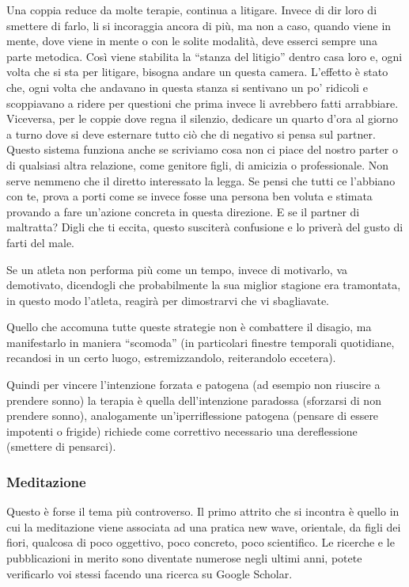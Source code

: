 \documentclass[12pt]{book} %
\begin{document}
Una coppia reduce da molte terapie, continua a litigare. Invece di dir loro di smettere di farlo, li si incoraggia
ancora di più, ma non a caso, quando viene in mente, dove viene in mente o con le solite modalità, deve esserci sempre
una parte metodica. Così viene stabilita la “stanza del litigio” dentro casa loro e, ogni volta che si sta per
litigare, bisogna andare un questa camera. L'effetto è stato che, ogni volta che andavano in questa stanza si sentivano
un po' ridicoli e scoppiavano a ridere per questioni che prima invece li avrebbero fatti arrabbiare. Viceversa, per le
coppie dove regna il silenzio, dedicare un quarto d'ora al giorno a turno dove si deve esternare
tutto ciò che di negativo si pensa sul partner. Questo sistema funziona anche se scriviamo cosa non ci piace del nostro
parter o di qualsiasi altra relazione, come genitore figli, di amicizia o professionale. Non serve nemmeno che il
diretto interessato la legga. Se pensi che tutti ce l'abbiano con te, prova a porti come se invece fosse una persona
ben voluta e stimata provando a fare un'azione concreta in questa direzione. E se il partner di maltratta? Digli che ti
eccita, questo susciterà confusione e lo priverà del gusto di farti del male.

Se un atleta non performa più come un tempo, invece di motivarlo, va demotivato, dicendogli che probabilmente la sua
miglior stagione era tramontata, in questo modo l'atleta, reagirà per dimostrarvi che vi sbagliavate. 

Quello che accomuna tutte queste strategie non è combattere il disagio, ma manifestarlo in maniera “scomoda” (in
particolari finestre temporali quotidiane, recandosi in un certo luogo, estremizzandolo, reiterandolo eccetera).

Quindi per vincere l'intenzione forzata e patogena (ad esempio non riuscire a prendere sonno) la
terapia è quella dell'intenzione paradossa (sforzarsi di non prendere sonno), analogamente
un'iperriflessione patogena (pensare di essere impotenti o frigide) richiede come correttivo
necessario una dereflessione (smettere di pensarci).

\subsubsection{Meditazione}
Questo è forse il tema più controverso. Il primo attrito che si incontra è quello in cui la meditazione viene associata
ad una pratica new wave, orientale, da figli dei fiori, qualcosa di poco oggettivo, poco concreto, poco scientifico. Le
ricerche e le pubblicazioni in merito sono diventate numerose negli ultimi anni, potete verificarlo voi stessi facendo
una ricerca su Google Scholar.
\end{document}
